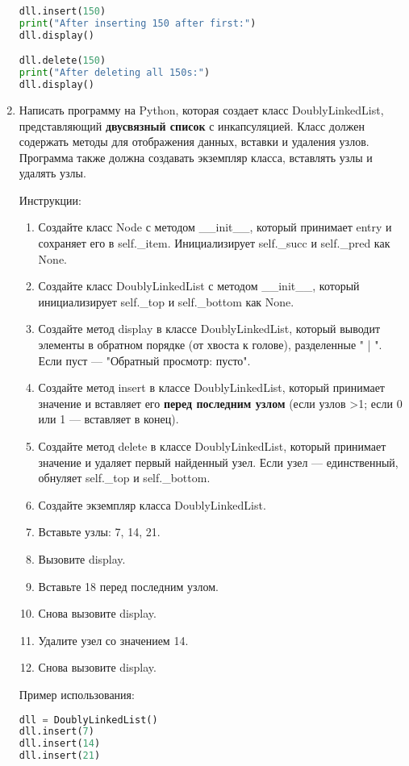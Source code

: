 \begin{enumerate}
\begin{lstlisting}[language=Python]
dll.insert(150)
print("After inserting 150 after first:")
dll.display()

dll.delete(150)
print("After deleting all 150s:")
dll.display()
\end{lstlisting}

\item Написать программу на Python, которая создает класс DoublyLinkedList, представляющий \textbf{двусвязный список} с инкапсуляцией. Класс должен содержать методы для отображения данных, вставки и удаления узлов. Программа также должна создавать экземпляр класса, вставлять узлы и удалять узлы.

Инструкции:
\begin{enumerate}
    \item Создайте класс Node с методом \_\_init\_\_, который принимает entry и сохраняет его в self.\_item. Инициализирует self.\_succ и self.\_pred как None.
    \item Создайте класс DoublyLinkedList с методом \_\_init\_\_, который инициализирует self.\_top и self.\_bottom как None.
    \item Создайте метод display в классе DoublyLinkedList, который выводит элементы в обратном порядке (от хвоста к голове), разделенные " | ". Если пуст — "Обратный просмотр: пусто".
    \item Создайте метод insert в классе DoublyLinkedList, который принимает значение и вставляет его \textbf{перед последним узлом} (если узлов >1; если 0 или 1 — вставляет в конец).
    \item Создайте метод delete в классе DoublyLinkedList, который принимает значение и удаляет первый найденный узел. Если узел — единственный, обнуляет self.\_top и self.\_bottom.
    \item Создайте экземпляр класса DoublyLinkedList.
    \item Вставьте узлы: 7, 14, 21.
    \item Вызовите display.
    \item Вставьте 18 перед последним узлом.
    \item Снова вызовите display.
    \item Удалите узел со значением 14.
    \item Снова вызовите display.
\end{enumerate}

Пример использования:
\begin{lstlisting}[language=Python]
dll = DoublyLinkedList()
dll.insert(7)
dll.insert(14)
dll.insert(21)


\end{lstlisting}
\end{enumerate}
